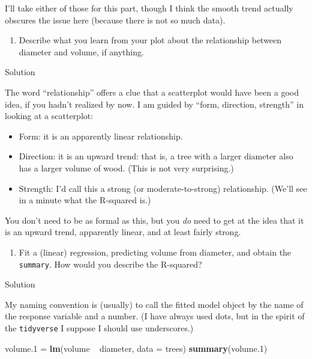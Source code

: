 \documentclass[]{tufte-book}
\newenvironment{Shaded}{}{}
\newcommand{\DataTypeTok}[1]{\textcolor[rgb]{0.56,0.13,0.00}{#1}}
\newcommand{\FloatTok}[1]{\textcolor[rgb]{0.25,0.63,0.44}{#1}}
\newcommand{\KeywordTok}[1]{\textcolor[rgb]{0.00,0.44,0.13}{\textbf{#1}}}
\newcommand{\NormalTok}[1]{#1}
\newcommand{\OperatorTok}[1]{\textcolor[rgb]{0.40,0.40,0.40}{#1}}
\newcommand{\StringTok}[1]{\textcolor[rgb]{0.25,0.44,0.63}{#1}}
\providecommand{\tightlist}{%
  \setlength{\itemsep}{0pt}\setlength{\parskip}{0pt}}
\theoremstyle{definition}
\theoremstyle{definition}
\theoremstyle{definition}
\theoremstyle{remark}
\begin{document}
I'll take either of those for this part, though I think the smooth trend
actually obscures the issue here (because there is not so much data).

\begin{enumerate}
\def\labelenumi{(\alph{enumi})}
\setcounter{enumi}{2}
\tightlist
\item
  Describe what you learn from your plot about the relationship between
  diameter and volume, if anything.
\end{enumerate}

Solution

The word ``relationship'' offers a clue that a scatterplot would have
been a good idea, if you hadn't realized by now. I am guided by ``form,
direction, strength'' in looking at a scatterplot:

\begin{itemize}
\item
  Form: it is an apparently linear relationship.
\item
  Direction: it is an upward trend: that is, a tree with a larger
  diameter also has a larger volume of wood. (This is not very
  surprising.)
\item
  Strength: I'd call this a strong (or moderate-to-strong) relationship.
  (We'll see in a minute what the R-squared is.)
\end{itemize}

You don't need to be as formal as this, but you \emph{do} need to get at
the idea that it is an upward trend, apparently linear, and at least
fairly strong.

\begin{enumerate}
\def\labelenumi{(\alph{enumi})}
\setcounter{enumi}{3}
\tightlist
\item
  Fit a (linear) regression, predicting volume from diameter, and obtain
  the \texttt{summary}. How would you describe the R-squared?
\end{enumerate}

Solution

My naming convention is (usually) to call the fitted model object by the
name of the response variable and a number. (I have always used dots,
but in the spirit of the \texttt{tidyverse} I suppose I should use
underscores.)

\begin{Shaded}
\begin{Highlighting}[]
\NormalTok{volume}\FloatTok{.1}\NormalTok{ =}\StringTok{ }\KeywordTok{lm}\NormalTok{(volume }\OperatorTok{~}\StringTok{ }\NormalTok{diameter, }\DataTypeTok{data =}\NormalTok{ trees)}
\KeywordTok{summary}\NormalTok{(volume}\FloatTok{.1}\NormalTok{)}
\end{Highlighting}
\end{Shaded}
\end{document}
